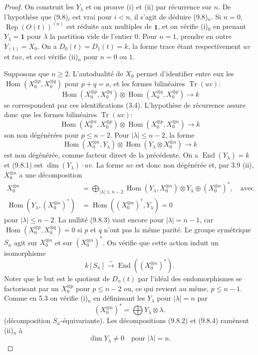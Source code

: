\documentclass[11pt,a4paper]{article}
\theoremstyle{plain}
\theoremstyle{definition}
\DeclareMathOperator{\Hom}{Hom}
\DeclareMathOperator{\End}{End}
\DeclareMathOperator{\Tr}{Tr}
\DeclareMathOperator{\Rep}{Rep}
\newcommand{\isom}{\xrightarrow{\sim}}
\begin{document}
\begin{proof}
On construit les $Y_\lambda$ et on prouve (i) et (ii) par r\'ecurrence sur $n$. De l'hypoth\`ese que (9.8)$_i$ est vrai pour $i < n$, il s'agit de d\'eduire (9.8)$_n$. Si $n = 0$, $\Rep(O(t))^{(n)}$ est r\'eduite aux multiples de $\mathbf{1}$, et on v\'erifie (i)$_0$ en prenant $Y_\lambda = \mathbf{1}$ pour $\lambda$ la partition vide de l'entier $0$. Pour $n = 1$, prendre en outre $Y_{(1)} = X_0$. On a $D_0(t) = D_1(t) = k$, la forme trace \'etant respectivement $uv$ et $tuv$, et ceci v\'erifie (ii)$_n$ pour $n = 0$ ou $1$.

Supposons que $n \geq 2$. L'autodualit\'e de $X_0$ permet d'identifier entre eux les $\Hom(X_0^{\otimes p}, X_0^{\otimes q})$ pour $p + q = a$, et les formes bilin\'eaires $\Tr(uv)$:
\[
\Hom(X_0^{\otimes p}, X_0^{\otimes q}) \otimes \Hom(X_0^{\otimes q}, X_0^{\otimes p}) \to k
\]
se correspondent par ces identifications (3.4). L'hypoth\`ese de r\'ecurrence assure donc que les formes bilin\'eaires $\Tr(uv)$:
\[
\Hom(X_0^{\otimes n}, X_0^{\otimes p}) \otimes \Hom(X_0^{\otimes p}, X_0^{\otimes n}) \to k
\]
son non d\'eg\'en\'er\'ees pour $p \leq n - 2$. Pour $|\lambda| \leq n - 2$, la forme
\begin{equation}
\Hom(X_0^{\otimes n}, Y_\lambda) \otimes \Hom(Y_\lambda \otimes X_0^{\otimes n}) \to k \tag{9.8.1}
\end{equation}
est non d\'eg\'en\'er\'ee, comme facteur direct de la pr\'ec\'edente. On a $\End(Y_\lambda) = k$ et (9.8.1) est $\dim(Y_\lambda) \cdot uv$. La forme $uv$ est donc non d\'eg\'en\'er\'ee et, par 3.9 (ii), $X_0^{\otimes n}$ a une d\'ecomposition
\begin{align}
X_0^{\otimes n} &= \bigoplus_{|\lambda| \leq n-2} \Hom(Y_\lambda, X_0^{\otimes n}) \otimes Y_\lambda \oplus (X_0^{\otimes n})^*, \quad \text{avec} \tag{9.8.2} \\
\Hom(Y_\lambda, (X_0^{\otimes n})^*) &= \Hom((X_0^{\otimes n})^*, Y_\lambda) = 0 \tag{9.8.3}
\end{align}
pour $|\lambda| \leq n - 2$. La nullit\'e (9.8.3) vaut encore pour $|\lambda| = n - 1$, car $\Hom(X_0^{\otimes p}, X_0^{\otimes q}) = 0$ si $p$ et $q$ n'ont pas la m\^eme parit\'e. Le groupe sym\'etrique $S_n$ agit sur $X_0^{\otimes n}$ et sur $(X_0^{\otimes n})^*$. On v\'erifie que cette action induit un isomorphisme
\[
k[S_n] \isom \End((X_0^{\otimes n})^*).
\]
Noter que le but est le quotient de $D_n(t)$ par l'id\'eal des endomorphismes se factorisant par un $X_0^{\otimes p}$ pour $p \leq n - 2$ ou, ce qui revient au m\^eme, $p \leq n - 1$. Comme en 5.3 on v\'erifie (i)$_n$ en d\'efinissant les $Y_\lambda$ pour $|\lambda| = n$ par
\begin{equation}
(X_0^{\otimes n})^* = \bigoplus Y_\lambda \otimes \lambda. \tag{9.8.4}
\end{equation}
(d\'ecomposition $S_n$-\'equivariante). Les d\'ecompositions (9.8.2) et (9.8.4) ram\`enent (ii)$_n$ \`a
\begin{equation}
\dim Y_\lambda \neq 0 \quad \text{pour } |\lambda| = n. \tag{9.8.5}
\end{equation}


\end{proof}
\end{document}
